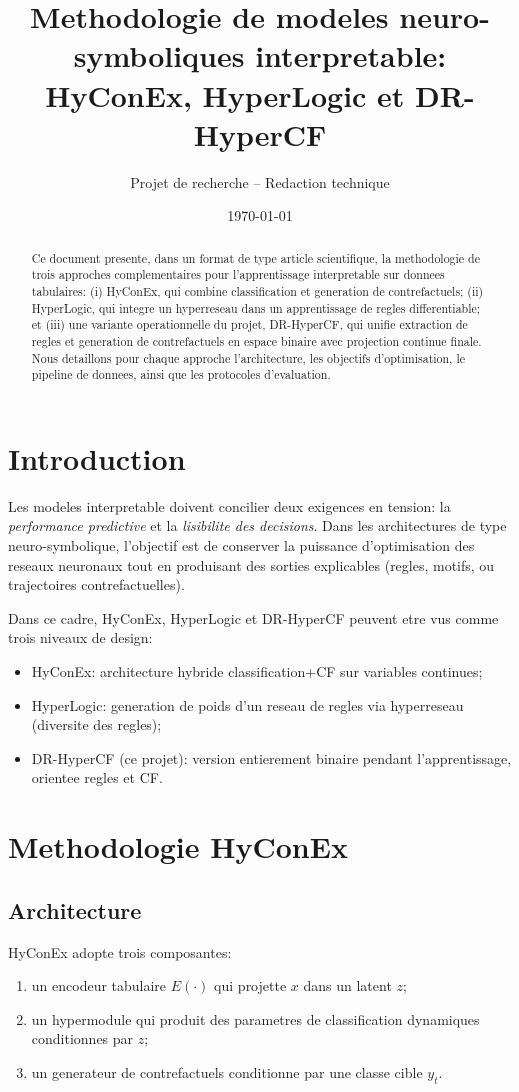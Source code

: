 \documentclass[11pt,a4paper]{article}
\title{Methodologie de modeles neuro-symboliques interpretable:\\
HyConEx, HyperLogic et DR-HyperCF}
\author{Projet de recherche -- Redaction technique}
\date{\today}
\begin{document}
\maketitle

\begin{abstract}
Ce document presente, dans un format de type article scientifique, la methodologie de trois approches
complementaires pour l'apprentissage interpretable sur donnees tabulaires:
(i) HyConEx, qui combine classification et generation de contrefactuels;
(ii) HyperLogic, qui integre un hyperreseau dans un apprentissage de regles differentiable;
et (iii) une variante operationnelle du projet, DR-HyperCF, qui unifie extraction de regles et
generation de contrefactuels en espace binaire avec projection continue finale.
Nous detaillons pour chaque approche l'architecture, les objectifs d'optimisation, le pipeline de donnees,
ainsi que les protocoles d'evaluation.
\end{abstract}

\section{Introduction}
Les modeles interpretable doivent concilier deux exigences en tension:
la \emph{performance predictive} et la \emph{lisibilite des decisions}.
Dans les architectures de type neuro-symbolique, l'objectif est de conserver la puissance d'optimisation
des reseaux neuronaux tout en produisant des sorties explicables (regles, motifs, ou trajectoires
contrefactuelles).

Dans ce cadre, HyConEx, HyperLogic et DR-HyperCF peuvent etre vus comme trois niveaux de design:
\begin{itemize}
    \item HyConEx: architecture hybride classification+CF sur variables continues;
    \item HyperLogic: generation de poids d'un reseau de regles via hyperreseau (diversite des regles);
    \item DR-HyperCF (ce projet): version entierement binaire pendant l'apprentissage, orientee regles et CF.
\end{itemize}

\section{Methodologie HyConEx}
\subsection{Architecture}
HyConEx adopte trois composantes:
\begin{enumerate}
    \item un encodeur tabulaire $E(\cdot)$ qui projette $x$ dans un latent $z$;
    \item un hypermodule qui produit des parametres de classification dynamiques conditionnes par $z$;
    \item un generateur de contrefactuels conditionne par une classe cible $y_t$.
\end{enumerate}
\end{document}
